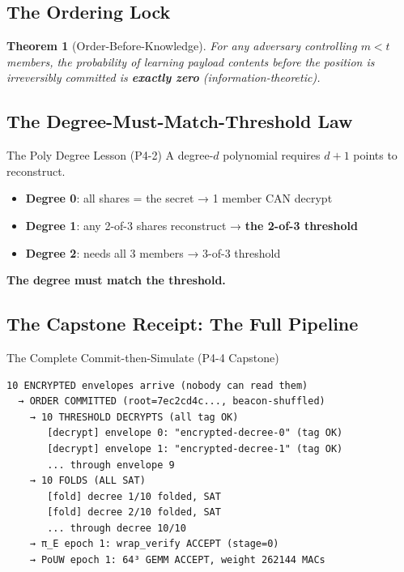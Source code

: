 \documentclass[11pt, a4paper]{article}
\newtheorem{theorem}{Theorem}
\begin{document}
\subsection{The Ordering Lock}

\begin{theorem}[Order-Before-Knowledge]
\label{thm:obk}
For any adversary controlling $m < t$ members, the probability of
learning payload contents before the position is irreversibly
committed is \textbf{exactly zero} (information-theoretic).
\end{theorem}

\subsection{The Degree-Must-Match-Threshold Law}

\begin{warnbox}{The Poly Degree Lesson (P4-2)}
A degree-$d$ polynomial requires $d+1$ points to reconstruct.
\begin{itemize}
\item \textbf{Degree 0}: all shares = the secret → 1 member CAN decrypt
\item \textbf{Degree 1}: any 2-of-3 shares reconstruct → \textbf{the 2-of-3 threshold}
\item \textbf{Degree 2}: needs all 3 members → 3-of-3 threshold
\end{itemize}
\textbf{The degree must match the threshold.}
\end{warnbox}

\subsection{The Capstone Receipt: The Full Pipeline}

\begin{receiptbox}{The Complete Commit-then-Simulate (P4-4 Capstone)}
\begin{verbatim}
10 ENCRYPTED envelopes arrive (nobody can read them)
  → ORDER COMMITTED (root=7ec2cd4c..., beacon-shuffled)
    → 10 THRESHOLD DECRYPTS (all tag OK)
       [decrypt] envelope 0: "encrypted-decree-0" (tag OK)
       [decrypt] envelope 1: "encrypted-decree-1" (tag OK)
       ... through envelope 9
    → 10 FOLDS (ALL SAT)
       [fold] decree 1/10 folded, SAT
       [fold] decree 2/10 folded, SAT
       ... through decree 10/10
    → π_E epoch 1: wrap_verify ACCEPT (stage=0)
    → PoUW epoch 1: 64³ GEMM ACCEPT, weight 262144 MACs
\end{verbatim}
\end{receiptbox}
\end{document}
